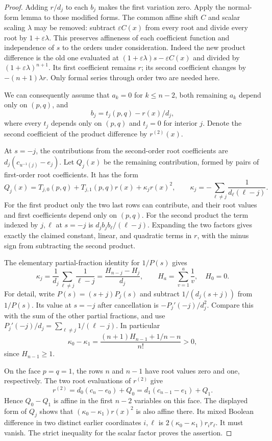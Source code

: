 \documentclass[11pt]{article}
\begin{document}
\begin{proof}
Adding $r/d_j$ to each $b_j$ makes the first variation zero.
Apply the normal-form lemma to those modified forms.
The common affine shift $C$ and scalar scaling $\lambda$ may be
removed: subtract $\varepsilon C(x)$ from every root and divide every
root by $1+\varepsilon\lambda$. This preserves affineness of each
coefficient function and independence of $s$ to the orders under
consideration. Indeed the new product difference is the old one
evaluated at $(1+\varepsilon\lambda)s-\varepsilon C(x)$ and divided
by $(1+\varepsilon\lambda)^{n+1}$.
Its first coefficient remains $r$; its second coefficient changes by
$-(n+1)\lambda r$.
Only formal series through order two are needed here.

We can consequently assume that $a_k=0$ for $k\le n-2$, both
remaining $a_k$ depend only on $(p,q)$, and
\[
 b_j=t_j(p,q)-r(x)/d_j,
\]
where every $t_j$ depends only on $(p,q)$ and $t_j=0$ for interior
$j$. Denote the second coefficient of the product difference by
$r^{(2)}(x)$.

At $s=-j$, the contributions from the second-order root coefficients
are $d_j(c_{u^{-1}(j)}-e_j)$. Let $Q_j(x)$ be the remaining
contribution, formed by pairs of first-order root coefficients.
It has the form
\[
 Q_j(x)=T_{j,0}(p,q)+T_{j,1}(p,q)r(x)+\kappa_j r(x)^2,
 \qquad
 \kappa_j=-\sum_{\ell\ne j}\frac1{d_\ell(\ell-j)}.
\]
For the first product only the two last rows can contribute, and
their root values and first coefficients depend only on $(p,q)$.
For the second product the term indexed by $j,\ell$ at $s=-j$ is
$d_j b_jb_\ell/(\ell-j)$. Expanding the two factors gives exactly
the claimed constant, linear, and quadratic terms in $r$, with the
minus sign from subtracting the second product.

The elementary partial-fraction identity for $1/P(s)$ gives
\[
 \kappa_j=\frac1{d_j}\sum_{\ell\ne j}\frac1{\ell-j}
          =\frac{H_{n-j}-H_j}{d_j},
 \qquad H_a=\sum_{v=1}^a\frac1v,\quad H_0=0.
\]
For detail, write $P(s)=(s+j)P_j(s)$ and subtract
$1/(d_j(s+j))$ from $1/P(s)$. Its value at $s=-j$ after cancellation
is $-P_j'(-j)/d_j^2$. Compare this with the sum of the other
partial fractions, and use
$P_j'(-j)/d_j=\sum_{\ell\ne j}1/(\ell-j)$.
In particular
\[
 \kappa_0-\kappa_1
 =\frac{(n+1)H_{n-1}+1/n-n}{n!}>0,
\]
since $H_{n-1}\ge1$.

On the face $p=q=1$, the rows $n$ and $n-1$ have root values zero
and one, respectively. The two root evaluations of $r^{(2)}$ give
\[
 r^{(2)}=d_0(c_n-e_0)+Q_0
        =d_1(c_{n-1}-e_1)+Q_1.
\]
Hence $Q_0-Q_1$ is affine in the first $n-2$ variables on this face.
The displayed form of $Q_j$ shows that
$(\kappa_0-\kappa_1)r(x)^2$ is also affine there.
Its mixed Boolean difference in two distinct earlier coordinates
$i,\ell$ is
$2(\kappa_0-\kappa_1)r_i r_\ell$. It must vanish.
The strict inequality for the scalar factor proves the assertion.
\end{proof}
\end{document}
